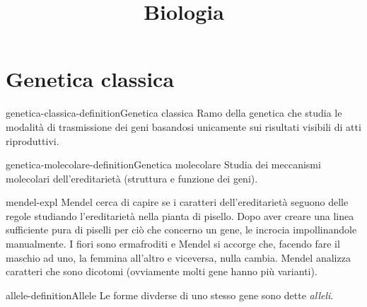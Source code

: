 \documentclass[preview]{standalone}
\begin{document}
\title{Biologia}
\genpage

\section{Genetica classica}

\begin{snippetdefinition}{genetica-classica-definition}{Genetica classica}
    Ramo della genetica che studia le modalità di trasmissione
    dei geni basandosi unicamente sui risultati visibili di atti riproduttivi.
\end{snippetdefinition}

\begin{snippetdefinition}{genetica-molecolare-definition}{Genetica molecolare}
    Studia dei meccanismi molecolari dell'ereditarietà (struttura e funzione dei geni).
\end{snippetdefinition}

%


\begin{snippet}{mendel-expl}
    Mendel cerca di capire se i caratteri dell'ereditarietà
    seguono delle regole studiando l'ereditarietà nella pianta di pisello.
    Dopo aver creare una linea sufficiente pura di piselli per ciò che concerno un gene,
    le incrocia impollinandole manualmente.
    I fiori sono ermafroditi e Mendel si accorge che, facendo fare il maschio ad uno, la femmina all'altro
    e viceversa, nulla cambia.
    Mendel analizza caratteri che sono dicotomi (ovviamente molti gene hanno più varianti).
\end{snippet}

\begin{snippetdefinition}{allele-definition}{Allele}
    Le forme divderse di uno stesso gene sono dette \textit{alleli}.
\end{snippetdefinition}
\end{document}
